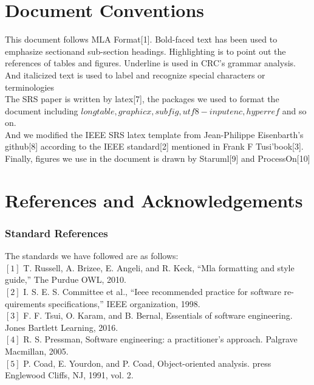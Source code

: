 \documentclass[16pt]{scrreprt}
\begin{document}
\section{Document Conventions}
This document follows MLA Format[1]. Bold-faced text has been used to emphasize sectionand sub-section headings. Highlighting is to point out the references of tables and figures. Underline is used in CRC's grammar analysis. And italicized text is used to label and recognize special characters or terminologies\\

\noindent The SRS paper is written by latex[7], the packages we used to format the document including \small{$longtable, graphicx, subfig, utf8-inputenc,hyperref$ }and so on.\\

\noindent And we modified the IEEE SRS latex template from Jean-Philippe Eisenbarth's github[8] according to the IEEE standard[2] mentioned in Frank F Tusi'book[3].\\

\noindent Finally, figures we use in the document is drawn by Staruml[9] and ProcessOn[10]

\section{References and Acknowledgements}
\subsubsection{Standard References}
The standards we have followed are as follows:\\

$[1]$ T. Russell, A. Brizee, E. Angeli, and R. Keck, “Mla formatting and style guide,” The Purdue OWL, 2010.\\

$[2]$ I. S. E. S. Committee et al., “Ieee recommended practice for software re- quirements specifications,” IEEE organization, 1998.\\


$[3]$ F. F. Tsui, O. Karam, and B. Bernal, Essentials of software engineering. Jones Bartlett Learning, 2016.\\

$[4]$ R. S. Pressman, Software engineering: a practitioner’s approach. Palgrave Macmillan, 2005.\\

$[5]$ P. Coad, E. Yourdon, and P. Coad, Object-oriented analysis. press Englewood Cliffs, NJ, 1991, vol. 2.\\
\end{document}
